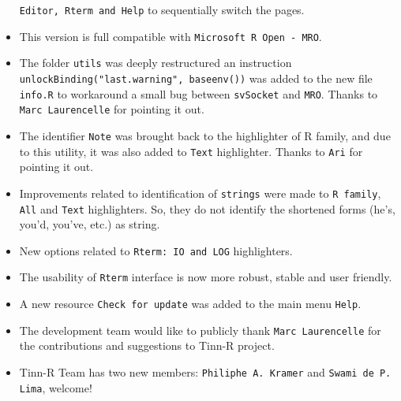 \begin{itemize}
    \texttt{Editor, Rterm and Help} to sequentially switch the pages.
  \item This version is full compatible with \texttt{Microsoft R Open - MRO}.
  \item The folder \texttt{utils} was deeply restructured an instruction \texttt{unlockBinding("last.warning", baseenv())}
    was added to the new file \texttt{info.R} to workaround a small bug between \texttt{svSocket} and \texttt{MRO}.
    Thanks to \texttt{Marc Laurencelle} for pointing it out.
  \item The identifier \texttt{Note} was brought back to the highlighter of R family, and due to this utility, it was also added to \texttt{Text} highlighter.
    Thanks to \texttt{Ari} for pointing it out.
  \item Improvements related to identification of \texttt{strings} were made to \texttt{R family}, \texttt{All} and \texttt{Text} highlighters.
    So, they do not identify the shortened forms (he's, you'd, you've, etc.) as string.
  \item New options related to \texttt{Rterm: IO and LOG} highlighters.
  \item The usability of \texttt{Rterm} interface is now more robust, stable and user friendly.
  \item A new resource \texttt{Check for update} was added to the main menu \texttt{Help}.
  \item The development team would like to publicly thank \texttt{Marc Laurencelle} for the contributions and suggestions to Tinn-R project.
  \item Tinn-R Team has two new members: \texttt{Philiphe A. Kramer} and \texttt{Swami de P. Lima}, welcome!
\end{itemize}